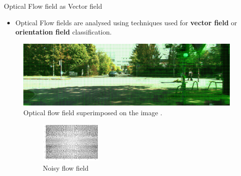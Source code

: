 \documentclass{beamer}
\begin{document}
\begin{frame}{Optical Flow field as Vector field}
\begin{itemize}
\item Optical Flow fields are analysed using techniques used for \textbf{vector field} or \textbf{orientation field} classification.
\end{itemize}

\begin{figure}[h]
            	\centering
            	\includegraphics[width =0.5\linewidth]{images/kitti_noisy_2.png} 
            	\caption{Optical flow field superimposed on the image \cite{kitti_data}.}
            \end{figure}
       
       
       
%




\begin{figure}[h]
         	\begin{subfigure}[t]{.5\textwidth}
         	\centering
         		\includegraphics[height=2cm,width=0.7\linewidth]{images/noisy_phase.png}
         		\caption{Noisy flow field }
         	\end{subfigure}\hfill%
         	\begin{subfigure}[t]{.5\textwidth}
         	\centering
         		

\end{subfigure}
\end{figure}
\end{frame}
\end{document}
